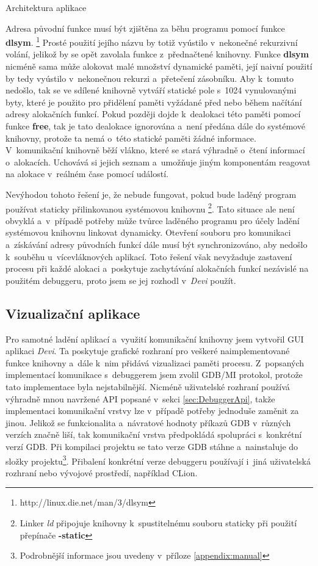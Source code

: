 \documentclass[czech,bachelor,male,python,dept460,hidelinks]{diploma}						%
\newcommand{\parspace}[1][]{
	\ifthenelse{\isempty{#1}}{\vspace{0mm}}{\vspace{#1}}
	\par
}
\begin{document}
\begin{section}{Architektura aplikace}
				\parspace Adresa původní funkce musí být zjištěna za běhu programu pomocí
				funkce \textbf{dlsym}. \footnote{http://linux.die.net/man/3/dlsym} Prosté použití jejího názvu by totiž vyústilo v~nekonečné rekurzivní volání, jelikož
				by se opět zavolala funkce z~přednačtené knihovny. Funkce \textbf{dlsym} nicméně sama může alokovat malé množství dynamické paměti,
				její naivní použití by tedy vyústilo v~nekonečnou rekurzi a~přetečení zásobníku.
				Aby k~tomuto nedošlo, tak se ve sdílené knihovně vytváří statické pole s~1024 vynulovanými
				byty, které je použito pro přidělení paměti vyžádané před nebo během načítání adresy alokačních funkcí. Pokud později dojde k~dealokaci této
				paměti pomocí funkce \textbf{free}, tak je tato dealokace ignorována a~není předána dále do systémové knihovny, protože ta nemá o~této statické paměti
				žádné informace. V~komunikační knihovně běží vlákno, které se stará výhradně o~čtení informací o~alokacích. Uchovává si jejich seznam
				a~umožňuje jiným komponentám reagovat na alokace v~reálném čase pomocí událostí.
				
				\parspace Nevýhodou tohoto řešení je, že nebude fungovat, pokud bude laděný program používat staticky přilinkovanou systémovou knihovnu
				\footnote{Linker \textit{ld} připojuje knihovny k~spustitelnému souboru staticky při použití přepínače \textbf{-static}}.
				Tato situace ale není obvyklá a~v~případě potřeby může tvůrce laděného programu pro účely ladění systémovou knihovnu linkovat dynamicky.
				Otevření souboru pro komunikaci a~získávání adresy původních funkcí dále musí být synchronizováno, aby nedošlo k~souběhu u~vícevláknových aplikací.
				Toto řešení však nevyžaduje zastavení procesu při každé alokaci a~poskytuje zachytávání alokačních funkcí nezávislé na použitém debuggeru, proto
				jsem se jej rozhodl v~\textit{Devi} použít.
			
\section{Vizualizační aplikace}
	Pro samotné ladění aplikací a~využití komunikační knihovny jsem vytvořil GUI aplikaci \textit{Devi}.
	Ta poskytuje grafické rozhraní pro veškeré naimplementované funkce knihovny a~dále k~nim přidává vizualizaci paměti procesu.
	Z~popsaných implementací komunikace s~debuggerem jsem zvolil GDB/MI protokol, protože tato implementace byla nejstabilnější.
	Nicméně uživatelské rozhraní používá výhradně mnou navržené API popsané v~sekci \ref{sec:DebuggerApi}, takže implementaci komunikační vrstvy
	lze v~případě potřeby jednoduše zaměnit za jinou. Jelikož se funkcionalita a~návratové hodnoty příkazů GDB v~různých verzích značně liší, tak komunikační vrstva
	předpokládá spolupráci s~konkrétní verzí GDB. Při kompilaci projektu se tato verze GDB stáhne a~nainstaluje do složky
	projektu\footnote{Podrobnější informace jsou uvedeny v~příloze \ref{appendix:manual}}. Přibalení konkrétní verze debuggeru používají i~jiná uživatelská
	rozhraní nebo vývojové prostředí, například CLion.
	

\end{section}
\end{document}
